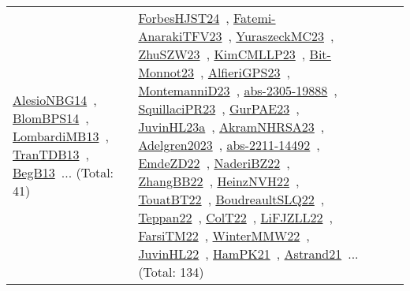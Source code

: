 {\begin{longtable}{lp{3cm}>{\raggedright\arraybackslash}p{6cm}>{\raggedright\arraybackslash}p{6cm}>{\raggedright\arraybackslash}p{8cm}}
\href{works/AlesioNBG14.pdf}{AlesioNBG14}~\cite{AlesioNBG14}, \href{works/BlomBPS14.pdf}{BlomBPS14}~\cite{BlomBPS14}, \href{works/LombardiMB13.pdf}{LombardiMB13}~\cite{LombardiMB13}, \href{works/TranTDB13.pdf}{TranTDB13}~\cite{TranTDB13}, \href{works/BegB13.pdf}{BegB13}~\cite{BegB13}... (Total: 41) & \href{works/ForbesHJST24.pdf}{ForbesHJST24}~\cite{ForbesHJST24}, \href{works/Fatemi-AnarakiTFV23.pdf}{Fatemi-AnarakiTFV23}~\cite{Fatemi-AnarakiTFV23}, \href{works/YuraszeckMC23.pdf}{YuraszeckMC23}~\cite{YuraszeckMC23}, \href{works/ZhuSZW23.pdf}{ZhuSZW23}~\cite{ZhuSZW23}, \href{works/KimCMLLP23.pdf}{KimCMLLP23}~\cite{KimCMLLP23}, \href{works/Bit-Monnot23.pdf}{Bit-Monnot23}~\cite{Bit-Monnot23}, \href{works/AlfieriGPS23.pdf}{AlfieriGPS23}~\cite{AlfieriGPS23}, \href{works/MontemanniD23.pdf}{MontemanniD23}~\cite{MontemanniD23}, \href{works/abs-2305-19888.pdf}{abs-2305-19888}~\cite{abs-2305-19888}, \href{works/SquillaciPR23.pdf}{SquillaciPR23}~\cite{SquillaciPR23}, \href{works/GurPAE23.pdf}{GurPAE23}~\cite{GurPAE23}, \href{works/JuvinHL23a.pdf}{JuvinHL23a}~\cite{JuvinHL23a}, \href{works/AkramNHRSA23.pdf}{AkramNHRSA23}~\cite{AkramNHRSA23}, \href{works/Adelgren2023.pdf}{Adelgren2023}~\cite{Adelgren2023}, \href{works/abs-2211-14492.pdf}{abs-2211-14492}~\cite{abs-2211-14492}, \href{works/EmdeZD22.pdf}{EmdeZD22}~\cite{EmdeZD22}, \href{works/NaderiBZ22.pdf}{NaderiBZ22}~\cite{NaderiBZ22}, \href{works/ZhangBB22.pdf}{ZhangBB22}~\cite{ZhangBB22}, \href{works/HeinzNVH22.pdf}{HeinzNVH22}~\cite{HeinzNVH22}, \href{works/TouatBT22.pdf}{TouatBT22}~\cite{TouatBT22}, \href{works/BoudreaultSLQ22.pdf}{BoudreaultSLQ22}~\cite{BoudreaultSLQ22}, \href{works/Teppan22.pdf}{Teppan22}~\cite{Teppan22}, \href{works/ColT22.pdf}{ColT22}~\cite{ColT22}, \href{works/LiFJZLL22.pdf}{LiFJZLL22}~\cite{LiFJZLL22}, \href{works/FarsiTM22.pdf}{FarsiTM22}~\cite{FarsiTM22}, \href{works/WinterMMW22.pdf}{WinterMMW22}~\cite{WinterMMW22}, \href{works/JuvinHL22.pdf}{JuvinHL22}~\cite{JuvinHL22}, \href{works/HamPK21.pdf}{HamPK21}~\cite{HamPK21}, \href{works/Astrand21.pdf}{Astrand21}~\cite{Astrand21}... (Total: 134)\\

\end{longtable}}
